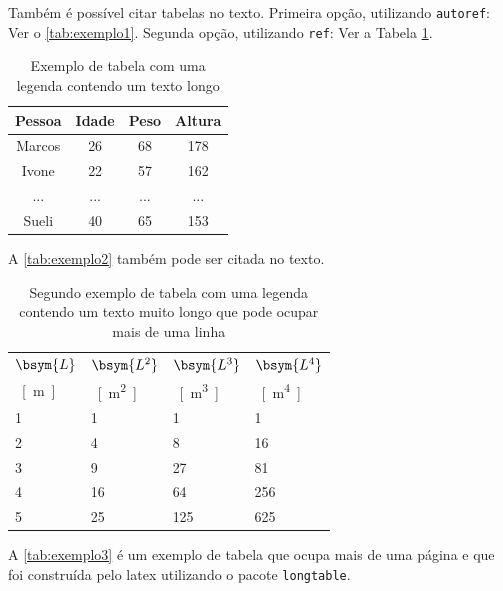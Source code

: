 Também é possível citar tabelas no texto. Primeira opção, utilizando \texttt{autoref}: Ver o \autoref{tab:exemplo1}. Segunda opção, utilizando  \texttt{ref}: Ver a Tabela \ref{tab:exemplo1}.

\begin{table}[htb]
\captionsetup{width=0.83\textwidth}
\centering
\caption{\label{tab:exemplo1}Exemplo de tabela com uma legenda contendo um texto longo}
\begin{tabular}{cccc}
	\hline
	\textbf{Pessoa} & \textbf{Idade} & \textbf{Peso} & \textbf{Altura} \\ \hline
	Marcos & 26    & 68   & 178    \\ 
	Ivone  & 22    & 57   & 162    \\ 
	...    & ...   & ...  & ...    \\ 
	Sueli  & 40    & 65   & 153    \\ \hline
\end{tabular}
\fonte{}
\end{table}

A \autoref{tab:exemplo2} também pode ser citada no texto.

\begin{table}[htb]%
\caption{Segundo exemplo de tabela com uma legenda contendo um texto muito longo que pode ocupar mais de uma linha}%
\label{tab:exemplo2}%
\begin{tabularx}{\textwidth}{@{\extracolsep{\fill}}llll}%
\toprule
$\bsym{L}$ & $\bsym{L^2}$ & $\bsym{L^3}$ & $\bsym{L^4}$ \\
\SI{}{[m]} & \SI{}{[m^2]} & \SI{}{[m^3]} & \SI{}{[m^4]} \\ \midrule
1          & 1            & 1            & 1            \\
2          & 4            & 8            & 16           \\
3          & 9            & 27           & 81           \\
4          & 16           & 64           & 256          \\
5          & 25           & 125          & 625          \\ \bottomrule
\end{tabularx}
\fonte{}%
\end{table}

A \autoref{tab:exemplo3} é um exemplo de tabela que ocupa mais de uma página e que foi construída pelo \gls{latex} utilizando o pacote \texttt{longtable}.

